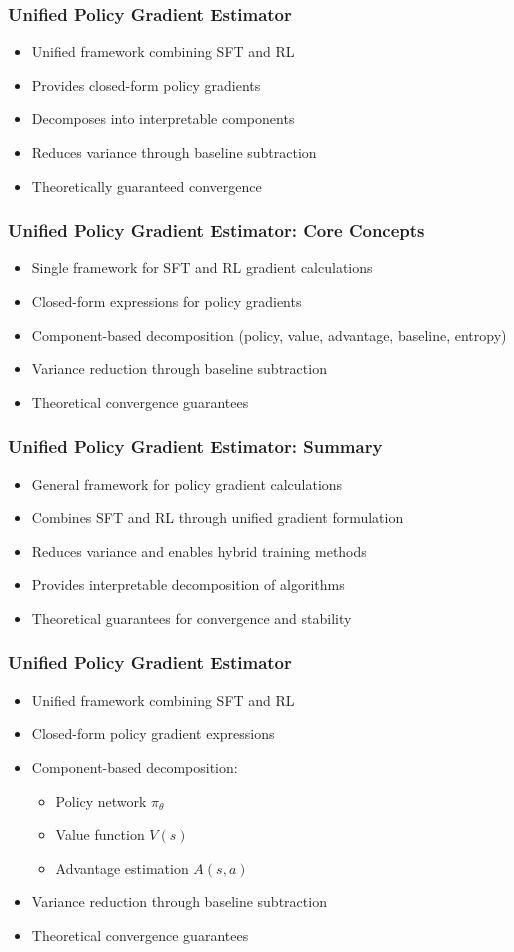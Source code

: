 \begin{frame}
\frametitle{Unified Policy Gradient Estimator}
\begin{itemize}
  \item Unified framework combining SFT and RL
  \item Provides closed-form policy gradients
  \item Decomposes into interpretable components
  \item Reduces variance through baseline subtraction
  \item Theoretically guaranteed convergence
\end{itemize}
\end{frame}%
\begin{frame}
\frametitle{Unified Policy Gradient Estimator: Core Concepts}
\begin{itemize}
  \item Single framework for SFT and RL gradient calculations
  \item Closed-form expressions for policy gradients
  \item Component-based decomposition (policy, value, advantage, baseline, entropy)
  \item Variance reduction through baseline subtraction
  \item Theoretical convergence guarantees
\end{itemize}
\end{frame}%
\begin{frame}
\frametitle{Unified Policy Gradient Estimator: Summary}
\begin{itemize}
  \item General framework for policy gradient calculations
  \item Combines SFT and RL through unified gradient formulation
  \item Reduces variance and enables hybrid training methods
  \item Provides interpretable decomposition of algorithms
  \item Theoretical guarantees for convergence and stability
\end{itemize}
\end{frame}%
\begin{frame}
\frametitle{Unified Policy Gradient Estimator}
\begin{itemize}
  \item Unified framework combining SFT and RL
  \item Closed-form policy gradient expressions
  \item Component-based decomposition:
    \begin{itemize}
      \item Policy network $\pi_\theta$
      \item Value function $V(s)$
      \item Advantage estimation $A(s,a)$
    \end{itemize}
  \item Variance reduction through baseline subtraction
  \item Theoretical convergence guarantees
\end{itemize}
\end{frame}%
